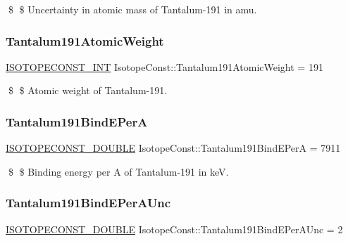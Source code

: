 \$ \$ Uncertainty in atomic mass of Tantalum-\/191 in amu. \mbox{\label{group___isotope_const-_tantalum-_ta191_ga48136aa2c9bdf3320c35aec1bc4a6e9e}} 
\subsubsection{\texorpdfstring{Tantalum191\+Atomic\+Weight}{Tantalum191AtomicWeight}}
{\footnotesize\ttfamily \mbox{\hyperlink{group___isotope_const-_macros_ga5f18360b3e99483a35c32d789e62621c}{I\+S\+O\+T\+O\+P\+E\+C\+O\+N\+S\+T\+\_\+\+I\+NT}} Isotope\+Const\+::\+Tantalum191\+Atomic\+Weight = 191}

\$ \$ Atomic weight of Tantalum-\/191. \mbox{\label{group___isotope_const-_tantalum-_ta191_ga69b97354da0657bb3e366dd0c0201def}} 
\subsubsection{\texorpdfstring{Tantalum191\+Bind\+E\+PerA}{Tantalum191BindEPerA}}
{\footnotesize\ttfamily \mbox{\hyperlink{group___isotope_const-_macros_ga8f45a7272ce02c0b4c65c44636ed719a}{I\+S\+O\+T\+O\+P\+E\+C\+O\+N\+S\+T\+\_\+\+D\+O\+U\+B\+LE}} Isotope\+Const\+::\+Tantalum191\+Bind\+E\+PerA = 7911}

\$ \$ Binding energy per A of Tantalum-\/191 in keV. \mbox{\label{group___isotope_const-_tantalum-_ta191_ga5f27eadb5ff9bfdeab89182e6e9508c9}} 
\subsubsection{\texorpdfstring{Tantalum191\+Bind\+E\+Per\+A\+Unc}{Tantalum191BindEPerAUnc}}
{\footnotesize\ttfamily \mbox{\hyperlink{group___isotope_const-_macros_ga8f45a7272ce02c0b4c65c44636ed719a}{I\+S\+O\+T\+O\+P\+E\+C\+O\+N\+S\+T\+\_\+\+D\+O\+U\+B\+LE}} Isotope\+Const\+::\+Tantalum191\+Bind\+E\+Per\+A\+Unc = 2}

